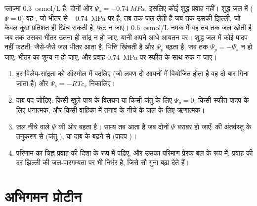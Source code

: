 \begin{example}[तीन विलयनों में एक लाल कोशिका]\label{ex:b1:membranes-transport:redcell}
प्लाज़्मा \qty{0.3}{osmol/L} है: दोनों ओर $\Psi_s = \qty{-0.74}{MPa}$,
इसलिए कोई शुद्ध प्रवाह नहीं। शुद्ध जल में ($\Psi = 0$) वह , जो
भीतर से \qty{-0.74}{MPa} पर है, तब तक जल लेती है जब तक उसकी झिल्ली, जो
केवल कुछ प्रतिशत ही खिंच सकती है, फट न जाए। \qty{0.6}{osmol/L} नमक में
वह तब तक जल खोती है जब तक उसका भीतर उतना ही सांद्र न हो जाए, यानी अपने
आधे आयतन पर। शुद्ध जल में कोई पादप  नहीं फटती: जैसे-जैसे जल भीतर
आता है, भित्ति खिंचती है और $\Psi_p$ बढ़ता है, जब तक $\Psi_p = -\Psi_s$
न हो जाए, भीतर का  शून्य न हो जाए, और प्रवाह \qty{0.74}{MPa} पर
स्फीत  के साथ रुक न जाए।
\end{example}

\begin{method}[जल-विभव का बहीखाता]\label{met:b1:membranes-transport:psi}
\begin{enumerate}
  \item हर विलेय-सांद्रता को ऑस्मोल में बदलिए (जो लवण दो आयनों में
        वियोजित होता है वह दो बार गिना जाता है) और $\Psi_s =
        -RTc_s$ निकालिए।
  \item दाब-पद जोड़िए: किसी खुले पात्र के विलयन या किसी जंतु  के
        लिए $\Psi_p = 0$, किसी स्फीत पादप  के लिए धनात्मक, और
        किसी  वाहिका में तनाव के नीचे के जल के लिए ऋणात्मक।
  \item जल नीचे वाले $\Psi$ की ओर बहता है। साम्य तब आता है जब दोनों
        $\Psi$ बराबर हो जाएँ:  की अंतर्वस्तु के तनुकरण से (जंतु
        ), या दाब के बढ़ने से (पादप )।
  \item परिणाम का चिह्न प्रवाह की दिशा के रूप में पढ़िए, और उसका
        परिमाण प्रेरक बल के रूप में; प्रवाह की दर झिल्ली की जल-पारगम्यता
        पर भी निर्भर है, जिसे   सौ गुना बढ़ा देते हैं।
\end{enumerate}
\end{method}

\section{अभिगमन प्रोटीन}

